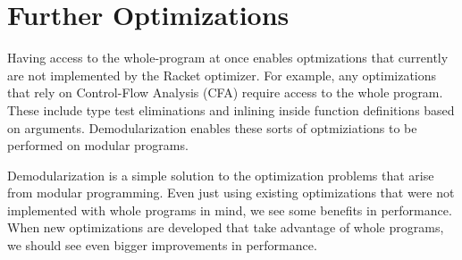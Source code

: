 \section{Further Optimizations}

Having access to the whole-program at once enables optmizations that currently are not implemented by the Racket optimizer.
For example, any optimizations that rely on Control-Flow Analysis (CFA) \cite{cfa} require access to the whole program.
These include type test eliminations and inlining inside function definitions based on arguments.
Demodularization enables these sorts of optmiziations to be performed on modular programs.

Demodularization is a simple solution to the optimization problems that arise from modular programming. 
Even just using existing optimizations that were not implemented with whole programs in mind, we see some benefits in performance. 
When new optimizations are developed that take advantage of whole programs, we should see even bigger improvements in performance.
